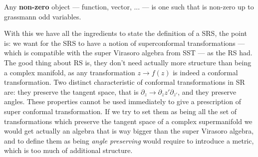\begin{definition}
    Any \textbf{non-zero} object --- function, vector, ... --- is one such that is non-zero up to grassmann odd 
    variables.
\end{definition}
With this we have all the ingredients to state the definition of a SRS, the point is: we want for the SRS to have a notion 
of superconformal transformations --- which is compatible with the super Virasoro algebra from SST --- as the RS had. The good thing about RS is, they don't need actually more structure than 
being a complex manifold, as any transformation $z\rightarrow f(z)$ is indeed a conformal transformation. Two 
distinct characteristic of conformal transformations in SR are: they preserve the tangent space, that is 
$\partial_z\rightarrow\partial_z z'\partial_{z'}$, and they preserve angles. These properties cannot be 
used immediately to give a prescription of super conformal transformation. If we try to set them as being 
all the set of transformations which preserve the tangent space of a complex supermanifold we would 
get actually an algebra that is way bigger than the super Virasoro algebra, and to define them as being 
\textit{angle preserving} would require to introduce a metric, which is too much of additional structure.

